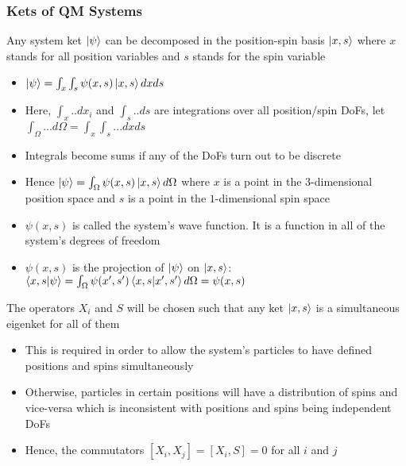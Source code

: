 \documentclass[8pt,t,mathserif,aspectratio=169]{beamer}
\begin{document}
\begin{frame}
  \frametitle{Kets of QM Systems}
  \vspace{1mm}
  Any system ket $\ket{\psi}$ can be decomposed in the position-spin basis $\ket{x,s}$ where $x$ stands for all position variables and $s$ stands for the spin variable
  \begin{itemize}
    \item $\ket{\psi} = \int_x \int_s \psi(x,s) \ket{x,s} dx ds$
    \item Here, $\int_x .. dx_i$ and $\int_s .. ds$ are integrations over all position/spin DoFs, let $\int_{\Omega} ... d\Omega = \int_x \int_s ... dx ds$
    \item Integrals become sums if any of the DoFs turn out to be discrete
    \item Hence $\ket{\psi} = \int_{\Omega} \psi(x,s) \ket{x,s} d\Omega$ where $x$ is a point in the $3$-dimensional position space and $s$ is a point in the $1$-dimensional spin space
    \item $\psi(x,s)$ is called the system's wave function. It is a function in all of the system's degrees of freedom
    \item $\psi(x,s)$ is the projection of $\ket{\psi}$ on $\ket{x,s}$: $\braket{x,s}{\psi} = \int_{\Omega} \psi(x',s') \braket{x,s}{x',s'} d\Omega = \psi(x,s)$
  \end{itemize}
  The operators $X_i$ and $S$ will be chosen such that any ket $\ket{x,s}$ is a simultaneous eigenket for all of them
  \begin{itemize}
    \item This is required in order to allow the system's particles to have defined positions and spins simultaneously
    \item Otherwise, particles in certain positions will have a distribution of spins and vice-versa which is inconsistent with positions and spins being independent DoFs
    \item Hence, the commutators $[X_i,X_j] = [X_i,S] = 0$ for all $i$ and $j$
  \end{itemize}
\end{frame}
\end{document}
